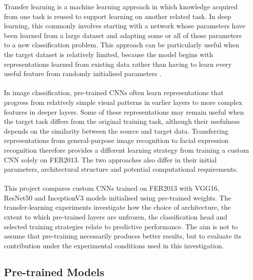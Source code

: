 \documentclass[12pt, a4paper]{report}
\let\oldsubsection\subsection
\renewcommand{\subsection}{%
    \Needspace{6\baselineskip}%
    \oldsubsection
}
\begin{document}
			Transfer learning is a machine learning approach in which knowledge acquired from one task is reused to support learning on another related task. In deep learning, this commonly involves starting with a network whose parameters have been learned from a large dataset and adapting some or all of those parameters to a new classification problem. This approach can be particularly useful when the target dataset is relatively limited, because the model begins with representations learned from existing data rather than having to learn every useful feature from randomly initialised parameters \cite{Pan2010TransferLearning}.\\\\
			In image classification, pre-trained CNNs often learn representations that progress from relatively simple visual patterns in earlier layers to more complex features in deeper layers. Some of these representations may remain useful when the target task differs from the original training task, although their usefulness depends on the similarity between the source and target data. Transferring representations from general-purpose image recognition to facial expression recognition therefore provides a different learning strategy from training a custom CNN solely on FER2013. The two approaches also differ in their initial parameters, architectural structure and potential computational requirements.\\\\
			This project compares custom CNNs trained on FER2013 with VGG16, ResNet50 and InceptionV3 models initialised using pre-trained weights. The transfer-learning experiments investigate how the choice of architecture, the extent to which pre-trained layers are unfrozen, the classification head and selected training strategies relate to predictive performance. The aim is not to assume that pre-training necessarily produces better results, but to evaluate its contribution under the experimental conditions used in this investigation.
			
			\subsection{Pre-trained Models}
				
\end{document}
